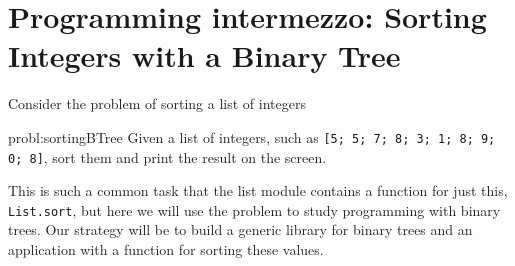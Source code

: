 \documentclass[fsharpNotes.tex]{subfiles}
\begin{document}
\section{Programming intermezzo: Sorting Integers with a Binary Tree}
Consider the problem of sorting a list of integers
\begin{task}{probl:sortingBTree}
  Given a list of integers, such as \lstinline{[5; 5; 7; 8; 3; 1; 8; 9; 0; 8]}, sort them and print the result on the screen.
\end{task}
This is such a common task that the list module contains a function for just this, \lstinline{List.sort}, but here we will use the problem to study programming with binary trees. Our strategy will be to build a generic library for binary trees and an application with a function for sorting these values.
\end{document}

